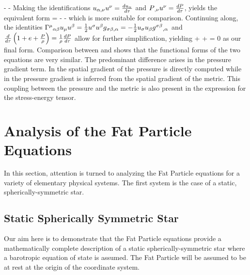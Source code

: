 \documentclass{article}
\begin{document}
- - \pvel{\ga} 
\ees
Making the identifications $ {u}{{}_{\alpha,\nu} }   {u}{{}^{\nu} }  =
 \frac{d  {u}{{}_{\alpha} } }{d \tau}$ and $ {P}{{}_{,\nu} }   {u}{{}^{\nu} } 
=  \frac{d P}{d \tau}$, yields the equivalent form
\bes
 \gr {}  =
- -   \eqc
\ees
which is more suitable for comparison.  Continuing along, the identities
$ {\Gamma}{{}^{\mu} {}_{\alpha\beta} }   {u}{{}_{\mu} }   {u}{{}^{\beta} }  =
\frac{1}{2}  {u}{{}^{\sigma} }   {u}{{}^{\beta} }   {g}{{}_{\sigma \beta , \alpha} }  =
-\frac{1}{2}  {u}{{}_{\sigma} }   {u}{{}_{\beta} }   { {g}{{}^{\sigma \beta} } }{{}_{,\alpha} } $ and
$ \frac{d}{d \tau}\left( {1 + e + \frac{P}{\rho}} \right) = \frac{1}{\rho}  \frac{d P}{d \tau}$ allow for
further simplification, yielding
\be\label{eq:Euler_final_form}
\dby{\gt} 
+   \pvel{\ga}\pvel{\gn}
+   = 0
\ee
as our final form.
Comparison between \sure{\ref{eq:Euler_final_form}} and \sure{\ref{eq:SPHEuler}} shows that
the functional forms of the two equations are very similar.
The predominant difference arises in the pressure gradient term.
In \sure{\ref{eq:Euler_final_form}} the spatial gradient of the pressure is directly
computed while in \sure{\ref{eq:SPHEuler}} the pressure gradient is inferred from the spatial
gradient of the metric.
This coupling between the pressure and the metric is also present in the expression for the
stress-energy tensor.

\section{Analysis of the Fat Particle Equations}

In this section, attention is turned to analyzing the Fat Particle equations for a
variety of elementary physical systems.  The first system is the case of a static,
spherically-symmetric star.

\subsection{Static Spherically Symmetric Star}

Our aim here is to demonstrate that the Fat Particle equations provide a
mathematically complete description of a static spherically-symmetric star
where a barotropic equation of state is assumed.  The Fat Particle will be
assumed to be at rest at the origin of the coordinate system.
\end{document}
